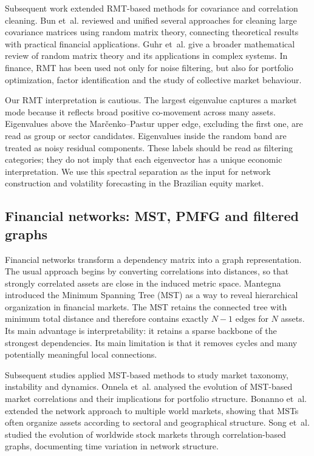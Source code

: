 Subsequent work extended RMT-based methods for covariance and correlation cleaning. Bun et~al. \cite{bun_2017_cleaning} reviewed and unified several approaches for cleaning large covariance matrices using random matrix theory, connecting theoretical results with practical financial applications. Guhr et~al. \cite{guhr_muller_1998} give a broader mathematical review of random matrix theory and its applications in complex systems. In finance, RMT has been used not only for noise filtering, but also for portfolio optimization, factor identification and the study of collective market behaviour.

Our RMT interpretation is cautious. The largest eigenvalue captures a market mode because it reflects broad positive co-movement across many assets. Eigenvalues above the Mar\v{c}enko--Pastur upper edge, excluding the first one, are read as group or sector candidates. Eigenvalues inside the random band are treated as noisy residual components. These labels should be read as filtering categories; they do not imply that each eigenvector has a unique economic interpretation. We use this spectral separation as the input for network construction and volatility forecasting in the Brazilian equity market.

\subsection{Financial networks: MST, PMFG and filtered graphs}

Financial networks transform a dependency matrix into a graph representation. The usual approach begins by converting correlations into distances, so that strongly correlated assets are close in the induced metric space. Mantegna \cite{mantegna_1999_hierarchical} introduced the Minimum Spanning Tree (MST) as a way to reveal hierarchical organization in financial markets. The MST retains the connected tree with minimum total distance and therefore contains exactly $N-1$ edges for $N$ assets. Its main advantage is interpretability: it retains a sparse backbone of the strongest dependencies. Its main limitation is that it removes cycles and many potentially meaningful local connections.

Subsequent studies applied MST-based methods to study market taxonomy, instability and dynamics. Onnela et~al. \cite{onnela_2003_dynamics} analysed the evolution of MST-based market correlations and their implications for portfolio structure. Bonanno et~al. \cite{bonanno_2004_networks} extended the network approach to multiple world markets, showing that MSTs often organize assets according to sectoral and geographical structure. Song et~al. \cite{song_2012_evolution} studied the evolution of worldwide stock markets through correlation-based graphs, documenting time variation in network structure.

